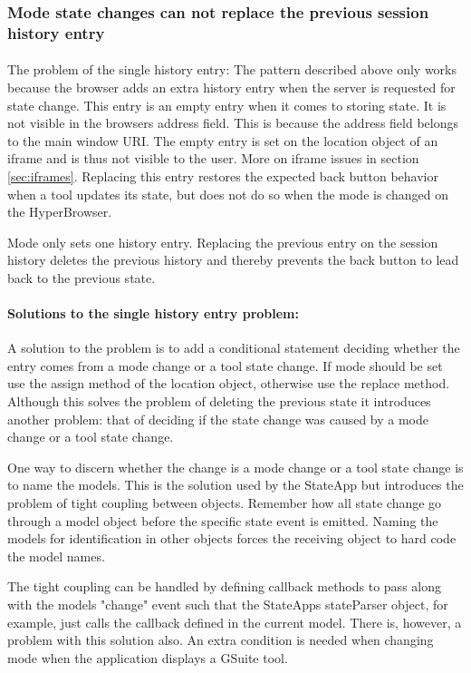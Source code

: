\documentclass[english]{ifimaster}
\begin{document}

\subsubsection{Mode state changes can not replace the previous session history entry}
\paragraph{}The problem of the single history entry:
The pattern described above only works because the browser adds an extra history entry when the server is requested for state change. This entry is an empty entry when it comes to storing state. It is not visible in the browsers address field. This is because the address field belongs to the main window URI. The empty entry is set on the location object of an iframe and is thus not visible to the user. More on iframe issues in section \ref{sec:iframes}. Replacing this entry restores the expected back button behavior when a tool updates its state, but does not do so when the mode is changed on the HyperBrowser. 

Mode only sets one history entry. Replacing the previous entry on the session history deletes the previous history and thereby prevents the back button to lead back to the previous state. 

\paragraph{Solutions to the single history entry problem:}
A solution to the problem is to add a conditional statement deciding whether the entry comes from a mode change or a tool state change. If mode should be set use the assign method of the location object, otherwise use the replace method. Although this solves the problem of deleting the previous state it introduces another problem: that of deciding if the state change was caused by a mode change or a tool state change.

One way to discern whether the change is a mode change or a tool state change is to name the models. This is the solution used by the StateApp but introduces the problem of tight coupling between objects. Remember how all state change go through a model object before the specific state event is emitted. Naming the models for identification in other objects forces the receiving object to hard code the model names. 

The tight coupling can be handled by defining callback methods to pass along with the models "change" event such that the StateApps stateParser object, for example, just calls the callback defined in the current model. There is, however, a problem with this solution also. An extra condition is needed when changing mode when the application displays a GSuite tool.
\end{document}
